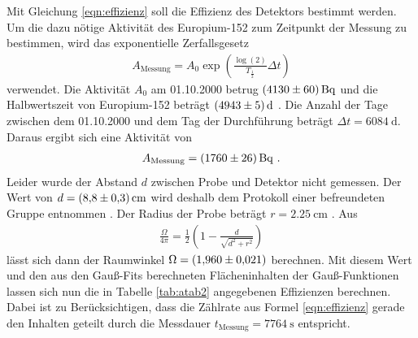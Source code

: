 Mit Gleichung \eqref{eqn:effizienz} soll die Effizienz des Detektors bestimmt werden.
Um die dazu nötige Aktivität des Europium-152 zum Zeitpunkt der Messung zu bestimmen, wird das exponentielle Zerfallsgesetz
\begin{align}
A_\text{Messung}=A_0\exp\left(\frac{\log(2)}{T_{\frac{1}{2}}}\Delta t\right)
\end{align}
verwendet.
Die Aktivität $A_0$ am 01.10.2000 betrug $\SI{4130+-60}{\becquerel}$ und die Halbwertszeit von Europium-152 beträgt $\SI{4943+-5}{\day}$ \cite{sample}.
Die Anzahl der Tage zwischen dem 01.10.2000 und dem Tag der Durchführung beträgt $\Delta t=\SI{6084}{\day}$.
Daraus ergibt sich eine Aktivität von
\begin{align*}
A_\text{Messung}=\SI{1760+-26}{\becquerel} \text{ .}
\end{align*}
Leider wurde der Abstand $d$ zwischen Probe und Detektor nicht gemessen.
Der Wert von $d=\SI{8.8+-0.3}{\centi\meter}$ wird deshalb dem Protokoll einer befreundeten Gruppe entnommen \cite{abstand}.
Der Radius der Probe beträgt $r=\SI{2.25}{\centi\meter}$ \cite{sample}.
Aus
\begin{align}
\frac{\Omega}{4\pi}=\frac{1}{2}\left( 1- \frac{d}{\sqrt{d^2+r^2}}\right)
\end{align}
lässt sich dann der Raumwinkel $\Omega=\SI{1.96+-0.021}{}$ berechnen.
Mit diesem Wert und den aus den Gauß-Fits berechneten Flächeninhalten der Gauß-Funktionen lassen sich nun die in Tabelle \ref{tab:atab2} angegebenen Effizienzen berechnen.
Dabei ist zu Berücksichtigen, dass die Zählrate aus Formel \ref{eqn:effizienz} gerade den Inhalten geteilt durch die Messdauer $t_\text{Messung}=\SI{7764}{\second}$ entspricht.
